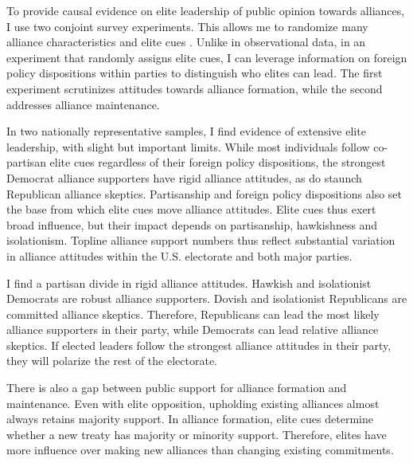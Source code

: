 \documentclass[12pt]{article}
\begin{document}
To provide causal evidence on elite leadership of public opinion towards alliances, I use two conjoint survey experiments.
This allows me to randomize many alliance characteristics and elite cues \citep{Hainmuelleretal2014}.
Unlike in observational data, in an experiment that randomly assigns elite cues, I can leverage information on foreign policy dispositions within parties to distinguish who elites can lead. 
The first experiment scrutinizes attitudes towards alliance formation, while the second addresses alliance maintenance. 


In two nationally representative samples, I find evidence of extensive elite leadership, with slight but important limits.
While most individuals follow co-partisan elite cues regardless of their foreign policy dispositions, the strongest Democrat alliance supporters have rigid alliance attitudes, as do staunch Republican alliance skeptics. 
Partisanship and foreign policy dispositions also set the base from which elite cues move alliance attitudes.
Elite cues thus exert broad influence, but their impact depends on partisanship, hawkishness and isolationism.
Topline alliance support numbers thus reflect substantial variation in alliance attitudes within the U.S. electorate and both major parties.


I find a partisan divide in rigid alliance attitudes.
Hawkish and isolationist Democrats are robust alliance supporters.
Dovish and isolationist Republicans are committed alliance skeptics. 
Therefore, Republicans can lead the most likely alliance supporters in their party, while Democrats can lead relative alliance skeptics. 
If elected leaders follow the strongest alliance attitudes in their party, they will polarize the rest of the electorate. 




There is also a gap between public support for alliance formation and maintenance.
Even with elite opposition, upholding existing alliances almost always retains majority support. 
In alliance formation, elite cues determine whether a new treaty has majority or minority support. 
Therefore, elites have more influence over making new alliances than changing existing commitments. 
\end{document}
